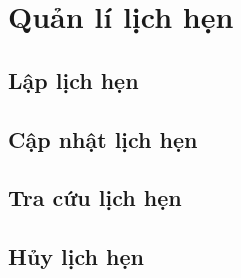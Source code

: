 \section{Quản lí lịch hẹn}

\subsection{Lập lịch hẹn}

\subsection{Cập nhật lịch hẹn}

\subsection{Tra cứu lịch hẹn}

\subsection{Hủy lịch hẹn}